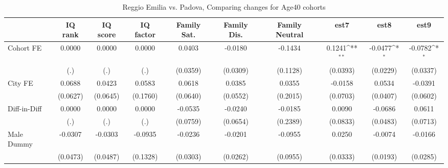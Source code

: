 \begin{table}[htbp]\centering
\def\sym#1{\ifmmode^{#1}\else\(^{#1}\)\fi}
\caption{Reggio Emilia vs. Padova, Comparing changes for Age40 cohorts}
\begin{tabular}{l*{9}{c}}
\toprule
            &\multicolumn{1}{c}{IQ rank}&\multicolumn{1}{c}{IQ score}&\multicolumn{1}{c}{IQ factor}&\multicolumn{1}{c}{Family Sat.}&\multicolumn{1}{c}{Family Dis.}&\multicolumn{1}{c}{Family Neutral}&\multicolumn{1}{c}{est7}&\multicolumn{1}{c}{est8}&\multicolumn{1}{c}{est9}\\
\midrule
Cohort FE   &      0.0000         &      0.0000         &      0.0000         &      0.0403         &     -0.0180         &     -0.1434         &      0.1241\sym{**} &     -0.0477\sym{*}  &     -0.0782\sym{*}  \\
            &         (.)         &         (.)         &         (.)         &    (0.0359)         &    (0.0309)         &    (0.1128)         &    (0.0393)         &    (0.0229)         &    (0.0337)         \\
\addlinespace
City FE     &      0.0688         &      0.0423         &      0.0583         &      0.0618         &      0.0385         &      0.0355         &     -0.0158         &      0.0534         &     -0.0391         \\
            &    (0.0627)         &    (0.0645)         &    (0.1760)         &    (0.0640)         &    (0.0552)         &    (0.2015)         &    (0.0703)         &    (0.0407)         &    (0.0602)         \\
\addlinespace
Diff-in-Diff&      0.0000         &      0.0000         &      0.0000         &     -0.0535         &     -0.0240         &     -0.0185         &      0.0090         &     -0.0686         &      0.0611         \\
            &         (.)         &         (.)         &         (.)         &    (0.0759)         &    (0.0654)         &    (0.2389)         &    (0.0833)         &    (0.0483)         &    (0.0713)         \\
\addlinespace
Male Dummy  &     -0.0307         &     -0.0303         &     -0.0935         &     -0.0236         &     -0.0201         &     -0.0955         &      0.0250         &     -0.0074         &     -0.0166         \\
            &    (0.0473)         &    (0.0487)         &    (0.1328)         &    (0.0303)         &    (0.0262)         &    (0.0955)         &    (0.0333)         &    (0.0193)         &    (0.0285)         \\

\end{tabular}
\end{table}
